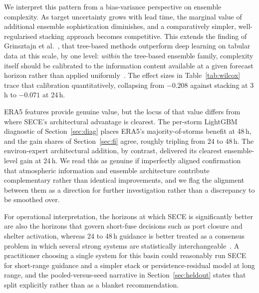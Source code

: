 \documentclass[10pt,twocolumn,a4paper]{article}
\newcommand{\sece}{SECE}
\newcommand{\era}{ERA5}
\begin{document}
We interpret this pattern from a bias-variance perspective on ensemble complexity.
As target uncertainty grows with lead time, the marginal value of additional
ensemble sophistication diminishes, and a comparatively simpler, well-regularised
stacking approach becomes competitive. This extends the finding of Grinsztajn et
al.~\cite{grinsztajn2022tree}, that tree-based methods outperform deep learning on
tabular data at this scale, by one level: \emph{within} the tree-based ensemble
family, complexity itself should be calibrated to the information content
available at a given forecast horizon rather than applied
uniformly~\cite{ganaie2022ensemble}. The effect sizes in
Table~\ref{tab:wilcox} trace that calibration quantitatively, collapsing from
$-0.208$ against stacking at 3\,h to $-0.071$ at 24\,h.

\era{} features provide genuine value, but the locus of that value differs from
where \sece{}'s architectural advantage is clearest. The per-storm LightGBM
diagnostic of Section~\ref{sec:diag} places \era{}'s majority-of-storms benefit at
48\,h, and the gain shares of Section~\ref{sec:fi} agree, roughly tripling from 24
to 48\,h. The environ-expert architectural addition, by contrast, delivered its
clearest ensemble-level gain at 24\,h. We read this as genuine if imperfectly
aligned confirmation that atmospheric information and ensemble architecture
contribute complementary rather than identical improvements, and we flag the
alignment between them as a direction for further investigation rather than a
discrepancy to be smoothed over.

For operational interpretation, the horizons at which \sece{} is significantly
better are also the horizons that govern short-fuse decisions such as port
closure and shelter activation, whereas 24 to 48\,h guidance is better treated as
a consensus problem in which several strong systems are statistically
interchangeable~\cite{goerss2000tropical,goerss2004tropical}. A practitioner
choosing a single system for this basin could reasonably run \sece{} for
short-range guidance and a simpler stack or persistence-residual model at long
range, and the pooled-versus-seed narrative in Section~\ref{sec:heldout} states
that split explicitly rather than as a blanket recommendation.
\end{document}
